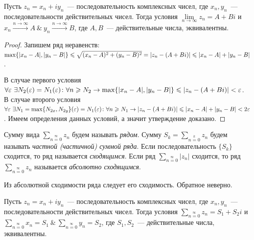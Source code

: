 \begin{statement}\label{7:complex_to_real}
Пусть \(z_n = x_n + iy_n\)~--- последовательность комплексных чисел, где \(x_n, y_n\)~---
последовательности действительных чисел. Тогда условия \(\lim\limits_{n \to \infty} z_n = A + Bi\) и
\(x_n \xrightarrow{n \to \infty} A \ \& \ y_n \xrightarrow{n \to \infty} B\), где \(A, B\)~---
действительные числа, эквивалентны.
\end{statement}

\begin{proof}
Запишем ряд неравенств: \(\max \{|x_n -A|, |y_n - B|\} \le \sqrt{(x_n-A)^2 + (y_n - B)^2} = |z_n -
(A\hm+Bi)| \le |x_n - A| + |y_n - B|\).

В случае первого условия \(\forall \epsilon \ \exists N_2 (\epsilon) = N_1(\epsilon) \colon \forall
n \ge N_2 \rightarrow \max \{|x_n -A|, |y_n - B|\} \hm\le |z_n - (A+Bi)| < \epsilon\). В случае
второго условия \(\forall \epsilon \ \exists N_1 = \max \{N_{2x}, N_{2y}\} (\epsilon) = N_1(\epsilon)
\colon \forall n \hm\ge N_1 \rightarrow|z_n - (A+Bi)| \le |x_n - A| + |y_n - B| < 2\epsilon\). Имеем
определения данных условий, а значит утверждение доказано.
\end{proof}

\begin{definition}
Сумму вида \(\sum\limits_{n=0}\limits^{\infty} z_n\) будем называть \textit{рядом}. Сумму \(S_k =
\sum\limits_{n=0}\limits^{k} z_n\) будем называть \textit{частной (частичной) суммой ряда}. Если
последовательность \(\{S_k\}\) сходится, то ряд называется \textit{сходящимся}. Если ряд
\(\sum\limits_{n=0}\limits^{\infty} |z_n|\) сходится, то ряд \(\sum\limits_{n=0}\limits^{\infty}
z_n\) называется \textit{абсолютно сходящимся}.
\end{definition}

\begin{note}
Из абсолютной сходимости ряда следует его сходимость. Обратное неверно.
\end{note}

\begin{statement}
Пусть \(z_n = x_n + iy_n\)~--- последовательность комплексных чисел, где \(x_n, y_n\)~---
последовательности действительных чисел. Тогда условия \(\sum\limits_{n=0}\limits^{\infty} z_n = S_1
+ S_2i\) и \(\sum\limits_{n=0}\limits^{\infty} x_n = S_1 \ \& \ \sum\limits_{n=0}\limits^{\infty}
y_n = S_2\), где \(S_1, S_2\)~--- действительные числа, эквивалентны.
\end{statement}

